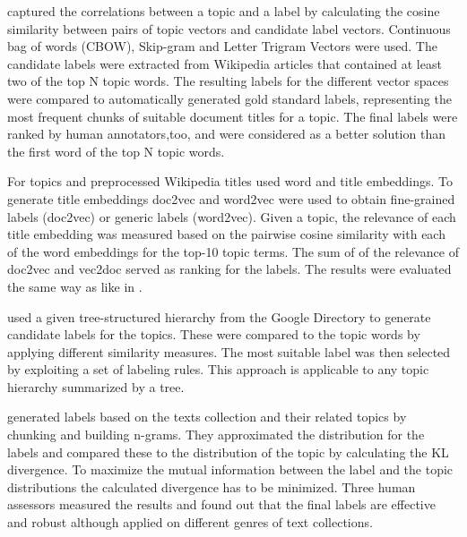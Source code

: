 \cite{Kou2015} captured the correlations between a topic and a label by calculating the cosine similarity between pairs of topic vectors and candidate label vectors. Continuous bag of words (CBOW), Skip-gram and Letter Trigram Vectors were used. The candidate labels were extracted from Wikipedia articles that contained at least two of the top N topic words. The resulting labels for the different vector spaces were compared to automatically generated gold standard labels, representing the most frequent chunks of suitable document titles for a topic. The final labels were ranked by human annotators,too, and were considered as a better solution than the first word of the top N topic words. 


For topics and preprocessed Wikipedia titles \textit{\cite{Bhatia2016}} used word and title embeddings. To generate title embeddings doc2vec and word2vec were used to obtain fine-grained labels (doc2vec) or generic labels (word2vec). Given a topic, the relevance of each title embedding was measured based on the pairwise cosine similarity with each of the word embeddings for the top-10 topic terms. The sum of of the relevance of doc2vec and vec2doc served as ranking for the labels. The results were evaluated the same way as like in \cite{Lau2011}.

\textit{\cite{Magatti2009}} used a given tree-structured hierarchy from the Google Directory to generate candidate labels for the topics. These were compared to the topic words by applying different similarity measures. The most suitable label was then selected by exploiting a set of labeling
rules. This approach is applicable to any topic hierarchy summarized by a tree.

\textit{\cite{Mei2007}} generated labels based on the texts collection and their related topics by chunking and building n-grams. They approximated the distribution for the labels and compared these to the distribution of the topic by calculating the \ac{KL} divergence. To maximize the mutual information between the label and the topic distributions the calculated divergence has to be minimized. Three human assessors measured the results and found out that the final labels are effective and robust although applied on different genres of text collections. 


